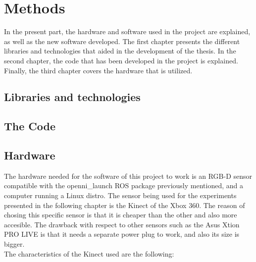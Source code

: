 \part*{Methods}
In the present part, the hardware and software used in the project are explained, as well as the new software developed. 
The first chapter presents the different libraries and technologies that aided in the development of the thesis. 
In the second chapter, the code that has been developed in the project is explained.
Finally, the third chapter covers the hardware that is utilized.


\chapter*{Libraries and technologies}



\chapter*{The Code}
  

\chapter*{Hardware}
The hardware needed for the software of this project to work is an RGB-D sensor compatible with the openni\_launch ROS package previously mentioned, and a computer running a Linux distro. 
The sensor being used for the experiments presented in the following chapter is the Kinect of the Xbox 360. The reason of chosing this specific sensor is that it is cheaper than the other
and also more accesible. The drawback with respect to other sensors such as the Asus Xtion PRO LIVE\cite{xtion} is that it needs a separate power plug to work, and also its size is bigger. 
\\

The characteristics of the Kinect used are the following: 



